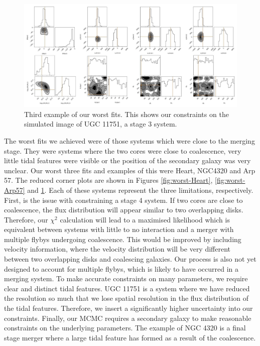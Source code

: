 \begin{figure}
    \centering
    \includegraphics[width=\textwidth]{Chapter1/figures/UGC11751-red-corner.pdf}
    \caption{Third example of our worst fits. This shows our constraints on the simulated image of UGC 11751, a stage 3 system.}
    \label{fig:worst-UGC11751}
\end{figure}

The worst fits we achieved were of those systems which were close to the merging stage. They were systems where the two cores were close to coalescence, very little tidal features were visible or the position of the secondary galaxy was very unclear. Our worst three fits and examples of this were Heart, NGC4320 and Arp 57. The reduced corner plots are shown in Figures \ref{fig:worst-Heart}, \ref{fig:worst-Arp57} and \ref{fig:worst-UGC11751}. Each of these systems represent the three limitations, respectively. First, is the issue with constraining a stage 4 system. If two cores are close to coalescence, the flux distribution will appear similar to two overlapping disks. Therefore, our $\chi^{2}$ calculation will lead to a maximised likelihood which is equivalent between systems with little to no interaction and a merger with multiple flybys undergoing coalescence. This would be improved by including velocity information, where the velocity distribution will be very different between two overlapping disks and coalescing galaxies. Our process is also not yet designed to account for multiple flybys, which is likely to have occurred in a merging system. To make accurate constraints on many parameters, we require clear and distinct tidal features. UGC 11751 is a system where we have reduced the resolution so much that we lose spatial resolution in the flux distribution of the tidal features. Therefore, we insert a significantly higher uncertainty into our constraints. Finally, our MCMC requires a secondary galaxy to make reasonable constraints on the underlying parameters. The example of NGC 4320 is a final stage merger where a large tidal feature has formed as a result of the coalescence.

